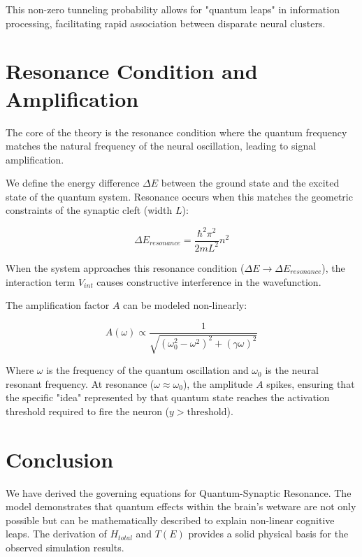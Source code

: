 \documentclass{article}
\begin{document}
This non-zero tunneling probability allows for "quantum leaps" in information processing, facilitating rapid association between disparate neural clusters.

\section{Resonance Condition and Amplification}

The core of the theory is the resonance condition where the quantum frequency matches the natural frequency of the neural oscillation, leading to signal amplification.

We define the energy difference $\Delta E$ between the ground state and the excited state of the quantum system. Resonance occurs when this matches the geometric constraints of the synaptic cleft (width $L$):

\begin{equation}
    \Delta E_{resonance} = \frac{\hbar^2 \pi^2}{2mL^2} n^2
\end{equation}

When the system approaches this resonance condition ($\Delta E \to \Delta E_{resonance}$), the interaction term $V_{int}$ causes constructive interference in the wavefunction.

The amplification factor $A$ can be modeled non-linearly:

\begin{equation}
    A(\omega) \propto \frac{1}{\sqrt{(\omega_0^2 - \omega^2)^2 + (\gamma\omega)^2}}
\end{equation}

Where $\omega$ is the frequency of the quantum oscillation and $\omega_0$ is the neural resonant frequency. At resonance ($\omega \approx \omega_0$), the amplitude $A$ spikes, ensuring that the specific "idea" represented by that quantum state reaches the activation threshold required to fire the neuron ($y > \text{threshold}$).

\section{Conclusion}

We have derived the governing equations for Quantum-Synaptic Resonance. The model demonstrates that quantum effects within the brain's wetware are not only possible but can be mathematically described to explain non-linear cognitive leaps. The derivation of $H_{total}$ and $T(E)$ provides a solid physical basis for the observed simulation results.
\end{document}
